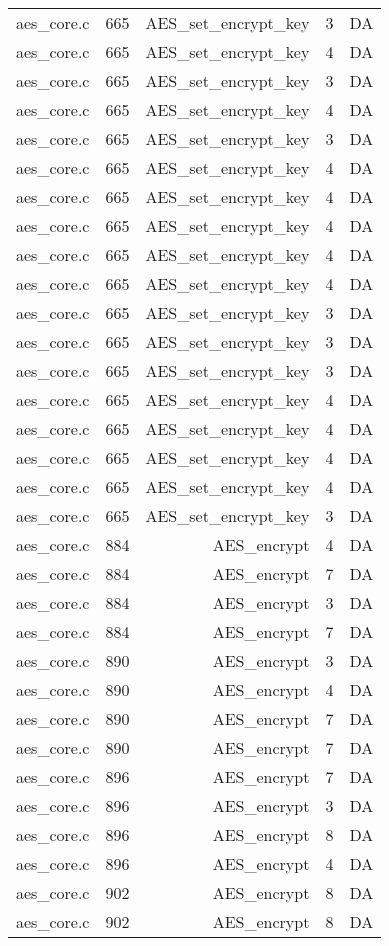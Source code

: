 \begin{table}
\begin{tabular}{clrrr}
aes\_core.c& 665&AES\_set\_encrypt\_key&3 &DA\\
aes\_core.c& 665&AES\_set\_encrypt\_key&4 &DA\\
aes\_core.c& 665&AES\_set\_encrypt\_key&3 &DA\\
aes\_core.c& 665&AES\_set\_encrypt\_key&4 &DA\\
aes\_core.c& 665&AES\_set\_encrypt\_key&3 &DA\\
aes\_core.c& 665&AES\_set\_encrypt\_key&4 &DA\\
aes\_core.c& 665&AES\_set\_encrypt\_key&4 &DA\\
aes\_core.c& 665&AES\_set\_encrypt\_key&4 &DA\\
aes\_core.c& 665&AES\_set\_encrypt\_key&4 &DA\\
aes\_core.c& 665&AES\_set\_encrypt\_key&4 &DA\\
aes\_core.c& 665&AES\_set\_encrypt\_key&3 &DA\\
aes\_core.c& 665&AES\_set\_encrypt\_key&3 &DA\\
aes\_core.c& 665&AES\_set\_encrypt\_key&3 &DA\\
aes\_core.c& 665&AES\_set\_encrypt\_key&4 &DA\\
aes\_core.c& 665&AES\_set\_encrypt\_key&4 &DA\\
aes\_core.c& 665&AES\_set\_encrypt\_key&4 &DA\\
aes\_core.c& 665&AES\_set\_encrypt\_key&4 &DA\\
aes\_core.c& 665&AES\_set\_encrypt\_key&3 &DA\\
aes\_core.c& 884&AES\_encrypt&4 &DA\\
aes\_core.c& 884&AES\_encrypt&7 &DA\\
aes\_core.c& 884&AES\_encrypt&3 &DA\\
aes\_core.c& 884&AES\_encrypt&7 &DA\\
aes\_core.c& 890&AES\_encrypt&3 &DA\\
aes\_core.c& 890&AES\_encrypt&4 &DA\\
aes\_core.c& 890&AES\_encrypt&7 &DA\\
aes\_core.c& 890&AES\_encrypt&7 &DA\\
aes\_core.c& 896&AES\_encrypt&7 &DA\\
aes\_core.c& 896&AES\_encrypt&3 &DA\\
aes\_core.c& 896&AES\_encrypt&8 &DA\\
aes\_core.c& 896&AES\_encrypt&4 &DA\\
aes\_core.c& 902&AES\_encrypt&8 &DA\\
aes\_core.c& 902&AES\_encrypt&8 &DA\\

\end{tabular}
\end{table}
